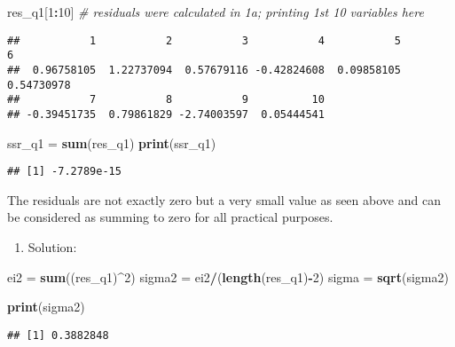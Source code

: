 \documentclass[
]{article}
\newenvironment{Shaded}{\begin{snugshade}}{\end{snugshade}}
\newcommand{\CommentTok}[1]{\textcolor[rgb]{0.56,0.35,0.01}{\textit{#1}}}
\newcommand{\DecValTok}[1]{\textcolor[rgb]{0.00,0.00,0.81}{#1}}
\newcommand{\KeywordTok}[1]{\textcolor[rgb]{0.13,0.29,0.53}{\textbf{#1}}}
\newcommand{\NormalTok}[1]{#1}
\newcommand{\OperatorTok}[1]{\textcolor[rgb]{0.81,0.36,0.00}{\textbf{#1}}}
\newcommand{\StringTok}[1]{\textcolor[rgb]{0.31,0.60,0.02}{#1}}
\providecommand{\tightlist}{%
  \setlength{\itemsep}{0pt}\setlength{\parskip}{0pt}}
\begin{document}
\begin{Shaded}
\begin{Highlighting}[]
\NormalTok{res_q1[}\DecValTok{1}\OperatorTok{:}\DecValTok{10}\NormalTok{] }\CommentTok{# residuals were calculated in 1a; printing 1st 10 variables here}
\end{Highlighting}
\end{Shaded}

\begin{verbatim}
##           1           2           3           4           5           6 
##  0.96758105  1.22737094  0.57679116 -0.42824608  0.09858105  0.54730978 
##           7           8           9          10 
## -0.39451735  0.79861829 -2.74003597  0.05444541
\end{verbatim}

\begin{Shaded}
\begin{Highlighting}[]
\NormalTok{ssr_q1 =}\StringTok{ }\KeywordTok{sum}\NormalTok{(res_q1)}
\KeywordTok{print}\NormalTok{(ssr_q1)}
\end{Highlighting}
\end{Shaded}

\begin{verbatim}
## [1] -7.2789e-15
\end{verbatim}

The residuals are not exactly zero but a very small value as seen above
and can be considered as summing to zero for all practical purposes.

\begin{enumerate}
\def\labelenumi{\alph{enumi})}
\setcounter{enumi}{5}
\tightlist
\item
  Solution:
\end{enumerate}

\begin{Shaded}
\begin{Highlighting}[]
\NormalTok{ei2 =}\StringTok{ }\KeywordTok{sum}\NormalTok{((res_q1)}\OperatorTok{^}\DecValTok{2}\NormalTok{)}
\NormalTok{sigma2 =}\StringTok{ }\NormalTok{ei2}\OperatorTok{/}\NormalTok{(}\KeywordTok{length}\NormalTok{(res_q1)}\OperatorTok{-}\DecValTok{2}\NormalTok{)}
\NormalTok{sigma =}\StringTok{ }\KeywordTok{sqrt}\NormalTok{(sigma2)}

\KeywordTok{print}\NormalTok{(sigma2)}
\end{Highlighting}
\end{Shaded}

\begin{verbatim}
## [1] 0.3882848
\end{verbatim}
\end{document}
